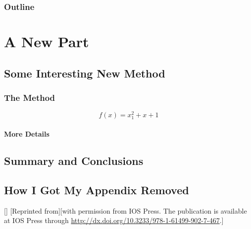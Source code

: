\documentclass[english]{his-thesis}
\begin{document}
\lipsum[6-10]

\section{Outline}
\label{sec_outline}

\lipsum[11]

\part{A New Part}

\chapter{Some Interesting New Method}

\lipsum[13-14]

\section{The Method}

\lipsum[1]

\begin{equation}
\label{eq_the_method}
    f(x) = x_1^2 + x + 1
\end{equation}

\lipsum[2]

\subsection{More Details}

\cite{krishnamurthy2003manageroverview,dedrick2006scope,henkel2006revealingemblinux,fitzgerald2003trencheslessons}
\lipsum[15-19]

\chapter{Summary and Conclusions}
\label{chap_conclusions}

\lipsum[20-25]

\begin{appendix}

\chapter{How I Got My Appendix Removed}

\lipsum[23-42]

\end{appendix}

\begin{fullarticles}
	[\href{https://creativecommons.org/licenses/by-nc-nd/4.0/}{\ccbyncnd}]
	[Reprinted from][with permission from IOS Press. The publication is available at IOS Press through \href{http://dx.doi.org/10.3233/978-1-61499-902-7-467}{http://dx.doi.org/10.3233/978-1-61499-902-7-467}.]
\end{fullarticles}

\listofreferences

\dissertationlist
\end{document}
